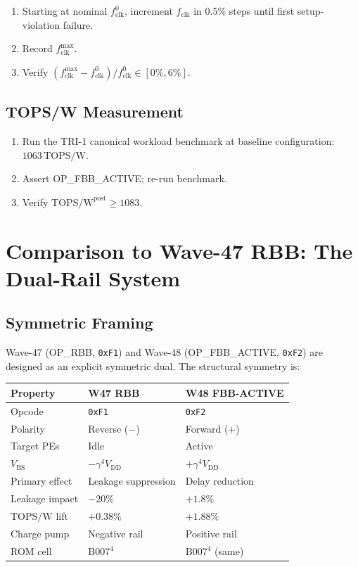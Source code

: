 \documentclass[12pt,a4paper]{report}
\theoremstyle{plain}
\theoremstyle{definition}
\theoremstyle{remark}
\newcommand{\opcode}[1]{\texttt{#1}}
\newcommand{\vdd}{V_{\mathrm{DD}}}
\newcommand{\gammaFour}{\gamma^{4}}
\newcommand{\topsw}{\mathrm{TOPS/W}}
\newcommand{\fclk}{f_{\mathrm{clk}}}
\begin{document}
\begin{enumerate}[leftmargin=2em]
  \item Starting at nominal $\fclk^{0}$, increment $\fclk$ in 0.5\% steps until first
        setup-violation failure.
  \item Record $\fclk^{\max}$.
  \item Verify $(\fclk^{\max} - \fclk^{0}) / \fclk^{0} \in [0\%, 6\%]$.
\end{enumerate}

\subsection{TOPS/W Measurement}

\begin{enumerate}[leftmargin=2em]
  \item Run the TRI-1 canonical workload benchmark at baseline configuration: $1063\,\topsw$.
  \item Assert OP\_FBB\_ACTIVE; re-run benchmark.
  \item Verify $\topsw^{\mathrm{post}} \geq 1083$.
\end{enumerate}

\section{Comparison to Wave-47 RBB: The Dual-Rail System}
\label{sec:comparison}

\subsection{Symmetric Framing}

Wave-47 (OP\_RBB, \opcode{0xF1}) and Wave-48 (OP\_FBB\_ACTIVE, \opcode{0xF2}) are
designed as an explicit symmetric dual.  The structural symmetry is:

\begin{center}
\begin{tabular}{lll}
\toprule
Property & W47 RBB & W48 FBB-ACTIVE \\
\midrule
Opcode & \opcode{0xF1} & \opcode{0xF2} \\
Polarity & Reverse ($-$) & Forward ($+$) \\
Target PEs & Idle & Active \\
$V_{\mathrm{BS}}$ & $-\gammaFour \vdd$ & $+\gammaFour \vdd$ \\
Primary effect & Leakage suppression & Delay reduction \\
Leakage impact & $-20\%$ & $+1.8\%$ \\
$\topsw$ lift & $+0.38\%$ & $+1.88\%$ \\
Charge pump & Negative rail & Positive rail \\
ROM cell & B007$^{4}$ & B007$^{4}$ (same) \\
\bottomrule
\end{tabular}
\end{center}
\end{document}

